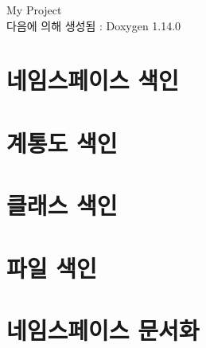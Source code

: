 \documentclass[twoside]{book}
\newcommand{\+}{\discretionary{\mbox{\scriptsize$\hookleftarrow$}}{}{}}
\newcommand{\clearemptydoublepage}{%
    \newpage{\pagestyle{empty}\cleardoublepage}%
  }
\begin{document}
  \raggedbottom
    \hypersetup{pageanchor=false,
                bookmarksnumbered=true,
                pdfencoding=unicode
               }
  \begin{titlepage}
  \vspace*{7cm}
  \begin{center}%
  {\Large My Project}\\
  \vspace*{1cm}
  {\large 다음에 의해 생성됨 \+:  Doxygen 1.14.0}\\
  \end{center}
  \end{titlepage}
  \clearemptydoublepage
  \tableofcontents
  \clearemptydoublepage
  \hypersetup{pageanchor=true}
\chapter{네임스페이스 색인}

\chapter{계통도 색인}

\chapter{클래스 색인}

\chapter{파일 색인}

\chapter{네임스페이스 문서화}

\end{document}
